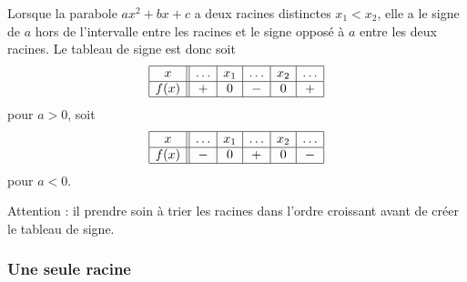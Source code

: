 \begin{enumerate}
\begin{multicols}{2}
            \columnbreak




        \end{multicols}

\end{enumerate}

\begin{Aretenir}
    Lorsque la parabole \( ax^2+bx+c\) a deux racines distinctes \( x_1<x_2\), elle a le signe de \( a\) hors de l'intervalle entre les racines et le signe opposé à \( a\) entre les deux racines. Le tableau de signe est donc soit
            \begin{equation}
                \begin{array}[h]{|c||c|c|c|c|c|}
                    \hline
                    x&\ldots&x_1&\ldots&x_2&\ldots\\
                    \hline
                    f(x)&+&0&-&0&+\\
                    \hline
                \end{array}
            \end{equation}
            pour \( a>0\), soit
            \begin{equation}
                \begin{array}[h]{|c||c|c|c|c|c|}
                    \hline
                    x&\ldots&x_1&\ldots&x_2&\ldots\\
                    \hline
                    f(x)&-&0&+&0&-\\
                    \hline
                \end{array}
            \end{equation}
            pour \( a<0\).

            Attention : il prendre soin à trier les racines dans l'ordre croissant avant de créer le tableau de signe.
\end{Aretenir}

\subsubsection{Une seule racine}

